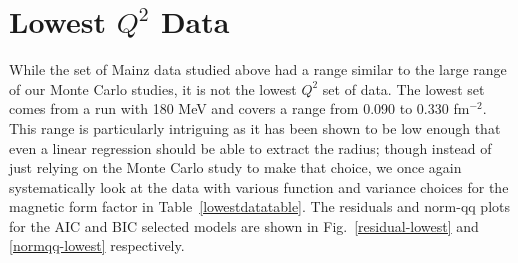 \documentclass[10pt,superscriptaddress,aps,prc,twocolumn]{revtex4-1}
\begin{document}
\section{Lowest $Q^2$ Data} 

While the set of Mainz data studied above had a range similar to the large range of our Monte Carlo studies, it is not
the lowest $Q^2$ set of data.   The lowest set comes from a run with 180 MeV 
and covers a range from 0.090 to 0.330 fm$^{-2}$.   This range is particularly intriguing as it has been shown to be
low enough that even a linear regression should be able to extract the radius; though instead of just relying on the Monte
Carlo study to make that choice, we once again systematically look at the data with various function and variance choices
for the magnetic form factor in Table~\ref{lowestdatatable}.   The residuals and norm-qq plots for the AIC and BIC selected
models are shown in Fig.~\ref{residual-lowest} and \ref{normqq-lowest} respectively.
\end{document}
